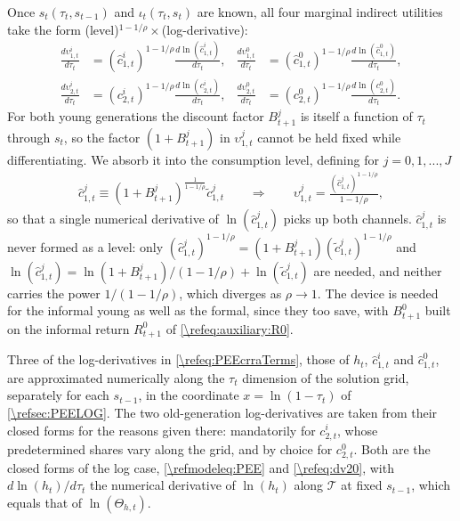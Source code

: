 Once $s_t(\tau_t,s_{t-1})$ and $\iota_t(\tau_t,s_t)$ are known, all four marginal indirect utilities take the form (level)$^{1-1/\rho}\times$(log-derivative):
\begin{subequations}\label{\refeq:PEEcrraTerms}
\begin{align}
    \frac{d\upsilon_{1,t}^i}{d\tau_t} &= \left(\hat{c}_{1,t}^i\right)^{1-1/\rho}\frac{d\ln\left(\hat{c}_{1,t}^i\right)}{d\tau_t}, &
    \frac{d\upsilon_{1,t}^0}{d\tau_t} &= \left(\hat{c}_{1,t}^0\right)^{1-1/\rho}\frac{d\ln\left(\hat{c}_{1,t}^0\right)}{d\tau_t}, \\
    \frac{d\upsilon_{2,t}^i}{d\tau_t} &= \left(c_{2,t}^i\right)^{1-1/\rho}\frac{d\ln\left(c_{2,t}^i\right)}{d\tau_t}, &
    \frac{d\upsilon_{2,t}^0}{d\tau_t} &= \left(c_{2,t}^0\right)^{1-1/\rho}\frac{d\ln\left(c_{2,t}^0\right)}{d\tau_t}.
\end{align}
\end{subequations}
For both young generations the discount factor $B_{t+1}^j$ is itself a function of $\tau_t$ through $s_t$, so the factor $\left(1+B_{t+1}^j\right)$ in $\upsilon_{1,t}^j$ cannot be held fixed while differentiating. We absorb it into the consumption level, defining for $j = 0,1,...,J$
\begin{align}\label{\refeq:hatc1}
    \hat{c}_{1,t}^j \equiv \left(1+B_{t+1}^j\right)^{\frac{1}{1-1/\rho}}\tilde{c}_{1,t}^j \qquad\Longrightarrow\qquad \upsilon_{1,t}^j = \frac{\left(\hat{c}_{1,t}^j\right)^{1-1/\rho}}{1-1/\rho},
\end{align}
so that a single numerical derivative of $\ln(\hat{c}_{1,t}^j)$ picks up both channels. $\hat{c}_{1,t}^j$ is never formed as a level: only $\left(\hat{c}_{1,t}^j\right)^{1-1/\rho} = \left(1+B_{t+1}^j\right)\left(\tilde{c}_{1,t}^j\right)^{1-1/\rho}$ and $\ln(\hat{c}_{1,t}^j) = \ln\left(1+B_{t+1}^j\right)/(1-1/\rho)+\ln(\tilde{c}_{1,t}^j)$ are needed, and neither carries the power $1/(1-1/\rho)$, which diverges as $\rho\rightarrow 1$. The device is needed for the informal young as well as the formal, since they too save, with $B_{t+1}^0$ built on the informal return $R_{t+1}^0$ of \eqref{\refeq:auxiliary:R0}.

Three of the log-derivatives in \eqref{\refeq:PEEcrraTerms}, those of $h_t$, $\hat{c}_{1,t}^i$ and $\hat{c}_{1,t}^0$, are approximated numerically along the $\tau_t$ dimension of the solution grid, separately for each $s_{t-1}$, in the coordinate $x = \ln(1-\tau_t)$ of \cref{\refsec:PEELOG}. The two old-generation log-derivatives are taken from their closed forms for the reasons given there: mandatorily for $c_{2,t}^i$, whose predetermined shares vary along the grid, and by choice for $c_{2,t}^0$. Both are the closed forms of the log case, \eqref{\refmodeleq:PEE} and \eqref{\refeq:dv20}, with $d\ln(h_t)/d\tau_t$ the numerical derivative of $\ln(h_t)$ along $\mathcal{T}$ at fixed $s_{t-1}$, which equals that of $\ln(\Theta_{h,t})$.

